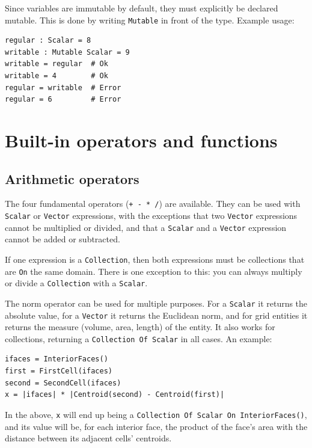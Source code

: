 \documentclass[11pt]{article}
\newcommand{\code}[1]{\texttt{#1}}
\begin{document}
Since variables are immutable by default, they must explicitly be declared mutable. This
is done by writing \code{Mutable} in front of the type. Example usage:

\begin{verbatim}
regular : Scalar = 8
writable : Mutable Scalar = 9
writable = regular  # Ok
writable = 4        # Ok
regular = writable  # Error
regular = 6         # Error
\end{verbatim}


\section{Built-in operators and functions}

\subsection{Arithmetic operators}

The four fundamental operators (\code{+ - * /}) are available. They can be used with
\code{Scalar} or \code{Vector} expressions, with the exceptions that two \code{Vector}
expressions cannot be multiplied or divided, and that a \code{Scalar} and a \code{Vector}
expression cannot be added or subtracted.

If one expression is a \code{Collection}, then both expressions must be collections that
are \code{On} the same domain. There is one exception to this: you can always multiply or
divide a \code{Collection} with a \code{Scalar}.

The norm operator can be used for multiple purposes. For a \code{Scalar} it returns the
absolute value, for a \code{Vector} it returns the Euclidean norm, and for grid entities
it returns the measure (volume, area, length) of the entity. It also works for
collections, returning a \code{Collection Of Scalar} in all cases. An example:

\begin{verbatim}
ifaces = InteriorFaces()
first = FirstCell(ifaces)
second = SecondCell(ifaces)
x = |ifaces| * |Centroid(second) - Centroid(first)|
\end{verbatim}

In the above, \code{x} will end up being a \code{Collection Of Scalar On InteriorFaces()},
and its value will be, for each interior face, the product of the face's area with the
distance between its adjacent cells' centroids.
\end{document}
